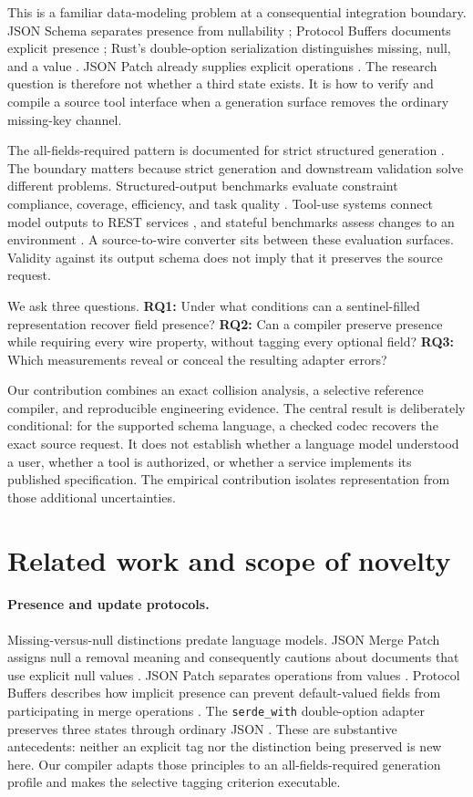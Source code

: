 \documentclass[10pt,twocolumn]{article}
\begin{document}
This is a familiar data-modeling problem at a consequential integration boundary. JSON Schema separates presence from nullability \citep{jsonschema}; Protocol Buffers documents explicit presence \citep{protobuf}; Rust's double-option serialization distinguishes missing, null, and a value \citep{serde}. JSON Patch already supplies explicit operations \citep{jsonpatch}. The research question is therefore not whether a third state exists. It is how to verify and compile a source tool interface when a generation surface removes the ordinary missing-key channel.

The all-fields-required pattern is documented for strict structured generation \citep{strictdocs}. The boundary matters because strict generation and downstream validation solve different problems. Structured-output benchmarks evaluate constraint compliance, coverage, efficiency, and task quality \citep{geng2025,lu2025}. Tool-use systems connect model outputs to REST services \citep{restgpt}, and stateful benchmarks assess changes to an environment \citep{toolsandbox}. A source-to-wire converter sits between these evaluation surfaces. Validity against its output schema does not imply that it preserves the source request.

We ask three questions. \textbf{RQ1:} Under what conditions can a sentinel-filled representation recover field presence? \textbf{RQ2:} Can a compiler preserve presence while requiring every wire property, without tagging every optional field? \textbf{RQ3:} Which measurements reveal or conceal the resulting adapter errors?

Our contribution combines an exact collision analysis, a selective reference compiler, and reproducible engineering evidence. The central result is deliberately conditional: for the supported schema language, a checked codec recovers the exact source request. It does not establish whether a language model understood a user, whether a tool is authorized, or whether a service implements its published specification. The empirical contribution isolates representation from those additional uncertainties.

\section{Related work and scope of novelty}
\paragraph{Presence and update protocols.}
Missing-versus-null distinctions predate language models. JSON Merge Patch assigns null a removal meaning and consequently cautions about documents that use explicit null values \citep{mergepatch}. JSON Patch separates operations from values \citep{jsonpatch}. Protocol Buffers describes how implicit presence can prevent default-valued fields from participating in merge operations \citep{protobuf}. The \texttt{serde\_with} double-option adapter preserves three states through ordinary JSON \citep{serde}. These are substantive antecedents: neither an explicit tag nor the distinction being preserved is new here. Our compiler adapts those principles to an all-fields-required generation profile and makes the selective tagging criterion executable.
\end{document}
